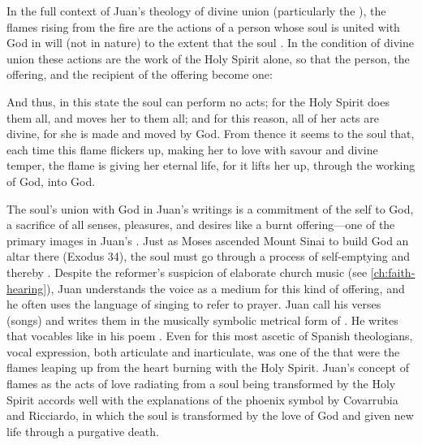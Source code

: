 In the full context of Juan's theology of divine union (particularly the
), the flames rising from the fire are the
actions of a person whose soul is united with God in will (not in nature) to
the extent that the soul .%
    \Autocite[227]{JuandelaCruz:Subida}
In the condition of divine union these actions are the work of the Holy Spirit
alone, so that the person, the offering, and the recipient of the offering
become one:
\begin{quoting}
    And thus, in this state the soul can perform no acts; for the Holy Spirit
    does them all, and moves her to them all; and for this reason, all of her
    acts are divine, for she is made and moved by God.  
    From thence it seems to
    the soul that, each time this flame flickers up, making her to love with
    savour and divine temper, the flame is giving her eternal life, for it
    lifts her up, through the working of God, into God.%
        \Autocite[791]{JuandelaCruz:Llama} 
\end{quoting}
The soul's union with God in Juan's writings is a commitment of the self to
God, a sacrifice of all senses, pleasures, and desires like a burnt
offering---one of the primary images in Juan's .
Just as Moses ascended Mount Sinai to build God an altar there (Exodus 34), the
soul must go through a process of self-emptying and thereby .%
    \autocite[191]{JuandelaCruz:Subida}
Despite the reformer's suspicion of elaborate church music (see
\cref{ch:faith-hearing}), Juan understands the voice as a medium for this kind
of offering, and he often uses the language of singing to refer to prayer.
Juan call his verses  (songs) and writes them in the
musically symbolic metrical form of . 
He writes that vocables like  in his poem .%
    \Autocite[790]{JuandelaCruz:Llama} 
Even for this most ascetic of Spanish theologians, vocal expression, both
articulate and inarticulate, was one of the  that were the
flames leaping up from the heart burning with the Holy Spirit.
Juan's concept of flames as the acts of love radiating from a soul being
transformed by the Holy Spirit accords well with the explanations of the
phoenix symbol by Covarrubia and Ricciardo, in which the soul is transformed by
the love of God and given new life through a purgative death.

